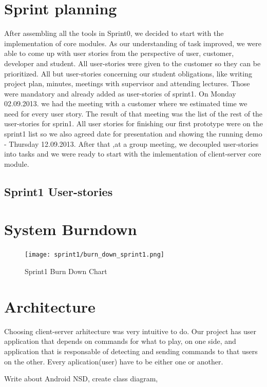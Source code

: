 \section{Sprint planning}
After assembling all the tools in Sprint0, we decided to start with the implementation of core modules.
As our understanding of task improved, we were able to come up with user stories from the perspective of user, customer, developer and student.
All user-stories were given to the customer so they can be prioritized. 
All but user-stories concerning our student obligations, like writing project plan, minutes, meetings with supervisor and attending lectures.
Those were mandatory and already added as user-stories of sprint1.
On Monday 02.09.2013. we had the meeting with a customer where we estimated time we need for every user story.
The result of that meeting was the list of the rest of the user-stories for sprin1.
All user stories for finishing our first prototype were on the sprint1 list so we also agreed date for presentation and showing the running demo - Thursday 12.09.2013. 
After that ,at a group meeting, we decoupled user-stories into tasks and we were ready to start with the imlementation of client-server core module.


\subsection{Sprint1 User-stories}

\section{System Burndown}

\begin{figure}[H]
	\centering
		\texttt{[image: sprint1/burn\_down\_sprint1.png]}
	\caption{Sprint1 Burn Down Chart}
	\label{fig:sprint1_burn_down_chart}
\end{figure}

\section{Architecture}

Choosing client-server arhitecture was very intuitive to do.
Our project has user application that depends on commands for what to play, on one side, and application that is responsable of detecting and sending commands to that users on the other.
Every aplication(user) have to be either one or another. 

Write about Android NSD, create class diagram, 


